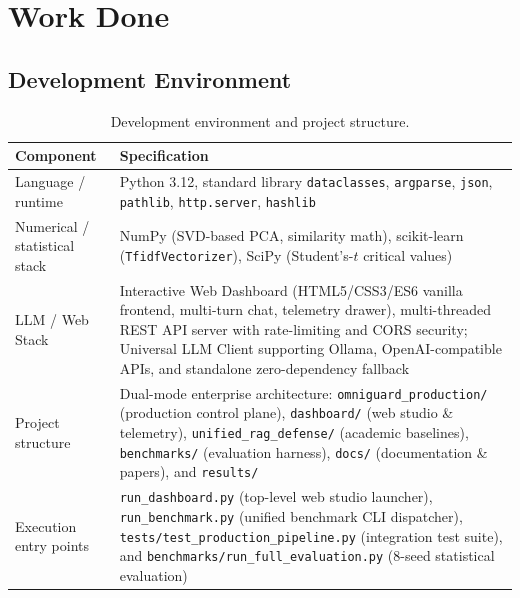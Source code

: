 \section{Work Done}
\label{sec:workdone}

\subsection{Development Environment}
\label{sec:devenv}

\begin{table}[htbp]
\centering
\small
\begin{tabularx}{\textwidth}{@{}l Y@{}}
\toprule
\textbf{Component} & \textbf{Specification} \\
\midrule
Language / runtime & Python 3.12, standard library \texttt{dataclasses}, \texttt{argparse}, \texttt{json}, \texttt{pathlib}, \texttt{http.server}, \texttt{hashlib} \\
Numerical / statistical stack & NumPy (SVD-based PCA, similarity math), scikit-learn (\texttt{TfidfVectorizer}), SciPy (Student's-$t$ critical values) \\
LLM / Web Stack & Interactive Web Dashboard (HTML5/CSS3/ES6 vanilla frontend, multi-turn chat, telemetry drawer), multi-threaded REST API server with rate-limiting and CORS security; Universal LLM Client supporting Ollama, OpenAI-compatible APIs, and standalone zero-dependency fallback \\
Project structure & Dual-mode enterprise architecture: \texttt{omniguard\_production/} (production control plane), \texttt{dashboard/} (web studio \& telemetry), \texttt{unified\_rag\_defense/} (academic baselines), \texttt{benchmarks/} (evaluation harness), \texttt{docs/} (documentation \& papers), and \texttt{results/} \\
Execution entry points & \texttt{run\_dashboard.py} (top-level web studio launcher), \texttt{run\_benchmark.py} (unified benchmark CLI dispatcher), \texttt{tests/test\_production\_pipeline.py} (integration test suite), and \texttt{benchmarks/run\_full\_evaluation.py} (8-seed statistical evaluation) \\
\bottomrule
\end{tabularx}
\caption{Development environment and project structure.}
\label{tab:devenv}
\end{table}

